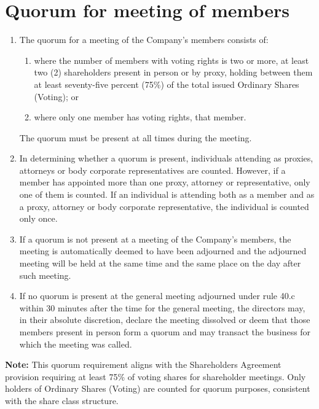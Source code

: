 \section{Quorum for meeting of members}

\begin{enumerate}[label=(\alph*)]
    \item The quorum for a meeting of the Company's members consists of:
    \begin{enumerate}[label=(\roman*)]
        \item where the number of members with voting rights is two or more, at least two (2) shareholders present in person or by proxy, holding between them at least seventy-five percent (75\%) of the total issued Ordinary Shares (Voting); or
        \item where only one member has voting rights, that member.
    \end{enumerate}
    
    The quorum must be present at all times during the meeting.
    
    \item In determining whether a quorum is present, individuals attending as proxies, attorneys or body corporate representatives are counted. However, if a member has appointed more than one proxy, attorney or representative, only one of them is counted. If an individual is attending both as a member and as a proxy, attorney or body corporate representative, the individual is counted only once.
    
    \item If a quorum is not present at a meeting of the Company's members, the meeting is automatically deemed to have been adjourned and the adjourned meeting will be held at the same time and the same place on the day after such meeting.
    
    \item If no quorum is present at the general meeting adjourned under rule 40.c within 30 minutes after the time for the general meeting, the directors may, in their absolute discretion, declare the meeting dissolved or deem that those members present in person form a quorum and may transact the business for which the meeting was called.
\end{enumerate}

\textbf{Note:} This quorum requirement aligns with the Shareholders Agreement provision requiring at least 75\% of voting shares for shareholder meetings. Only holders of Ordinary Shares (Voting) are counted for quorum purposes, consistent with the share class structure. 